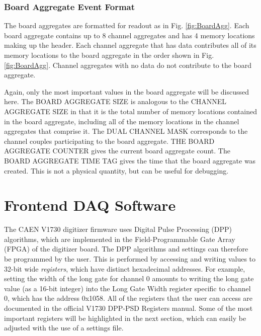 \subsubsection{Board Aggregate Event Format} %

The board aggregates are formatted for readout as in Fig. \ref{fig:BoardAgg}. Each board aggregate contains up to 8 channel aggregates and has 4 memory locations making up the header. Each channel aggregate that has data contributes all of its memory locations to the board aggregate in the order shown in Fig. \ref{fig:BoardAgg}. Channel aggregates with no data do not contribute to the board aggregate.

Again, only the most important values in the board aggregate will be discussed here. The BOARD AGGREGATE SIZE is analogous to the CHANNEL AGGREGATE SIZE in that it is the total number of memory locations contained in the board aggregate, including all of the memory locations in the channel aggregates that comprise it. The DUAL CHANNEL MASK corresponds to the channel couples participating to the board aggregate. THE BOARD AGGREGATE COUNTER gives the current board aggregate count. The BOARD AGGREGATE TIME TAG gives the time that the board aggregate was created. This is not a physical quantity, but can be useful for debugging.



\section{Frontend DAQ Software} \label{sec:frontend}


The CAEN V1730 digitizer firmware uses Digital Pulse Processing (DPP) algorithms, which are implemented in the Field-Programmable Gate Array (FPGA) of the digitizer board. The DPP algorithms and settings can therefore be programmed by the user. This is performed by accessing and writing values to 32-bit wide \emph{registers}, which have distinct hexadecimal addresses. For example, setting the width of the long gate for channel 0 amounts to writing the long gate value (as a 16-bit integer) into the Long Gate Width register specific to channel 0, which has the address 0x1058. All of the registers that the user can access are documented in the official V1730 DPP-PSD Registers manual. %
Some of the most important registers will be highlighted in the next section, which can easily be adjusted with the use of a settings file.

